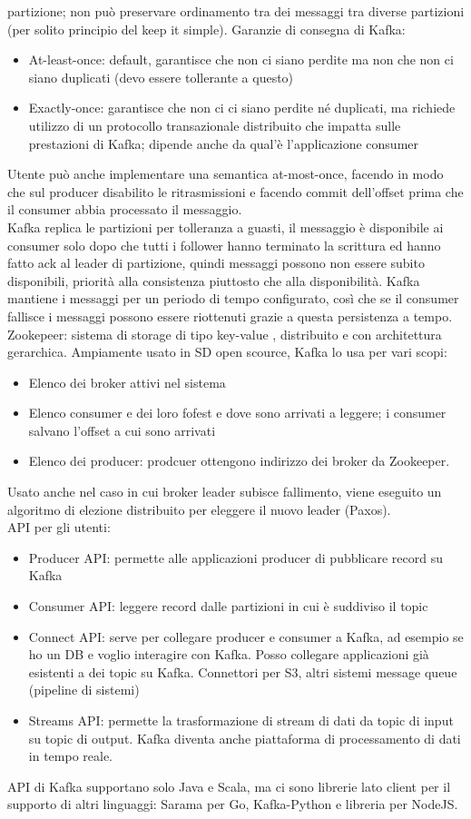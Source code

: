 \documentclass[16px]{article}
\begin{document}
partizione; non può preservare ordinamento tra dei messaggi tra diverse partizioni (per solito principio del keep it simple). Garanzie di consegna di Kafka:
\begin{itemize}
\item At-least-once: default, garantisce che non ci siano perdite ma non che non ci siano duplicati (devo essere tollerante a questo)
\item Exactly-once: garantisce che non ci ci siano perdite né duplicati, ma richiede utilizzo di un protocollo transazionale distribuito che impatta sulle prestazioni di Kafka; dipende anche da qual'è l'applicazione consumer
\end{itemize}
Utente può anche implementare una semantica at-most-once, facendo in modo che sul producer disabilito le ritrasmissioni e facendo commit dell'offset prima che il consumer abbia processato il messaggio.\\ Kafka replica le partizioni per tolleranza a guasti, il messaggio è disponibile ai consumer solo dopo che tutti i follower hanno terminato la scrittura ed hanno fatto ack al leader di partizione, quindi messaggi possono non essere subito disponibili, priorità alla consistenza piuttosto che alla disponibilità. Kafka mantiene i messaggi per un periodo di tempo configurato, così che se il consumer fallisce i messaggi possono essere riottenuti grazie a questa persistenza a tempo.\\ Zookepeer: sistema di storage di tipo key-value , distribuito e con architettura gerarchica. Ampiamente usato in SD open scource, Kafka lo usa per vari scopi:
\begin{itemize}
\item Elenco dei broker attivi nel sistema
\item Elenco consumer e dei loro fofest e dove sono arrivati a leggere; i consumer salvano l'offset a cui sono arrivati
\item Elenco dei producer: prodcuer ottengono indirizzo dei broker da Zookeeper.
\end{itemize}
Usato anche nel caso in cui broker leader subisce fallimento, viene eseguito un algoritmo di elezione distribuito per eleggere il nuovo leader (Paxos).\\ API per gli utenti:
\begin{itemize}
\item Producer API: permette alle applicazioni producer di pubblicare record su Kafka
\item Consumer API: leggere record dalle partizioni in cui è suddiviso il topic
\item Connect API: serve per collegare producer e consumer a Kafka, ad esempio se ho un DB e voglio interagire con Kafka. Posso collegare applicazioni già esistenti a dei topic su Kafka. Connettori per S3, altri sistemi message queue (pipeline di sistemi)
\item Streams API: permette la trasformazione di stream di dati da topic di input su topic di output. Kafka diventa anche piattaforma di processamento di dati in tempo reale.
\end{itemize}
API di Kafka supportano solo Java e Scala, ma ci sono librerie lato client per il supporto di altri linguaggi: Sarama per Go, Kafka-Python e libreria per NodeJS.
\end{document}
